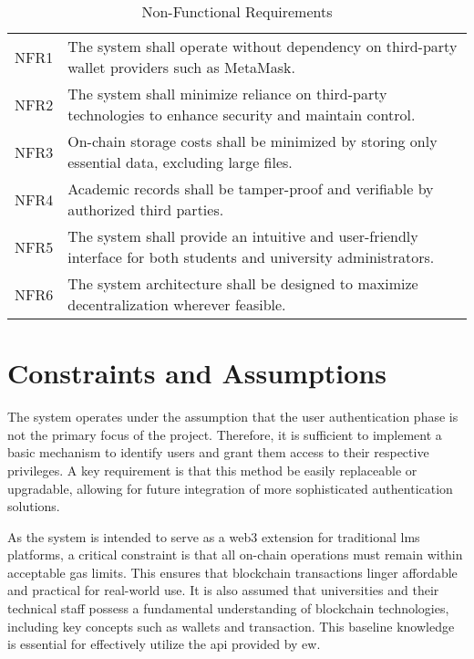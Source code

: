 \begin{table}
\centering
\caption{Non-Functional Requirements}
\label{tab:nonFuncReq}
\begin{tabular}{|p{1.0cm}|p{11cm}|}
\hline
NFR1 & The system shall operate without dependency on third-party wallet providers such as MetaMask. \\
NFR2 & The system shall minimize reliance on third-party technologies to enhance security and maintain control. \\
NFR3 & On-chain storage costs shall be minimized by storing only essential data, excluding large files. \\
NFR4 & Academic records shall be tamper-proof and verifiable by authorized third parties. \\
NFR5 & The system shall provide an intuitive and user-friendly interface for both students and university administrators. \\
NFR6 & The system architecture shall be designed to maximize decentralization wherever feasible. \\
\hline
\end{tabular}
\end{table}


\section{Constraints and Assumptions}
The system operates under the assumption that the user authentication phase is not the primary focus of the project. Therefore, it is sufficient to implement a basic mechanism to identify users and grant them access to their respective privileges. A key requirement is that this method be easily replaceable or upgradable, allowing for future integration of more sophisticated authentication solutions.

As the system is intended to serve as a \Gls{web3} extension for traditional \acrshort{lms} platforms, a critical constraint is that all on-chain operations must remain within acceptable gas limits. This ensures that blockchain transactions linger affordable and practical for real-world use. It is also assumed that universities and their technical staff possess a fundamental understanding of blockchain technologies, including key concepts such as wallets and transaction. This baseline knowledge is essential for effectively utilize the \acrshort{api} provided by \acrshort{ew}.
